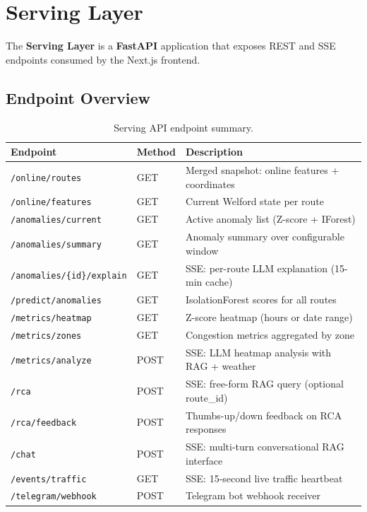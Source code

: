 \section{Serving Layer}
\label{sec:impl-serving}

The \textbf{Serving Layer} is a \textbf{FastAPI} application that exposes
REST and SSE endpoints consumed by the Next.js frontend.

\subsection{Endpoint Overview}

\begin{table}[htbp]
\centering
\caption{Serving API endpoint summary.}
\label{tab:endpoints}
\begin{tabular}{lll}
\hline
\textbf{Endpoint} & \textbf{Method} & \textbf{Description} \\
\hline
\texttt{/online/routes}              & GET  & Merged snapshot: online features + coordinates \\
\texttt{/online/features}           & GET  & Current Welford state per route \\
\texttt{/anomalies/current}         & GET  & Active anomaly list (Z-score + IForest) \\
\texttt{/anomalies/summary}         & GET  & Anomaly summary over configurable window \\
\texttt{/anomalies/\{id\}/explain}  & GET  & SSE: per-route LLM explanation (15-min cache) \\
\texttt{/predict/anomalies}         & GET  & IsolationForest scores for all routes \\
\texttt{/metrics/heatmap}           & GET  & Z-score heatmap (hours or date range) \\
\texttt{/metrics/zones}             & GET  & Congestion metrics aggregated by zone \\
\texttt{/metrics/analyze}           & POST & SSE: LLM heatmap analysis with RAG + weather \\
\texttt{/rca}                       & POST & SSE: free-form RAG query (optional route\_id) \\
\texttt{/rca/feedback}              & POST & Thumbs-up/down feedback on RCA responses \\
\texttt{/chat}                      & POST & SSE: multi-turn conversational RAG interface \\
\texttt{/events/traffic}            & GET  & SSE: 15-second live traffic heartbeat \\
\texttt{/telegram/webhook}          & POST & Telegram bot webhook receiver \\
\hline
\end{tabular}
\end{table}

